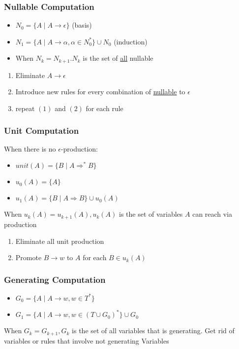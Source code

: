 \documentclass[20pt]{article} %
\begin{document}
\subsubsection{Nullable Computation}
\begin{itemize}
\item $N_0 = \{ A \mid A \rightarrow \epsilon \}$ (basis)
\item $N_1 = \{ A \mid A \rightarrow \alpha, \alpha \in N_0^{*} \} \cup N_0$ (induction)
\item When $N_k = N_{k+1}. N_k$ is the set of \underline{all} nullable
\end{itemize}
\begin{enumerate}
\item Eliminate $A \rightarrow \epsilon$
\item Introduce new rules for every combination of \underline{nullable} to \underline{$\epsilon$}
\item repeat $(1)$ and $(2)$ for each rule
\end{enumerate}
\subsubsection{Unit Computation}
When there is no $\epsilon$-production:
\begin{itemize}
\item $unit(A) = \{ B \mid A \Rightarrow^{*} B \}$
\item $u_0(A) = \{A\}$
\item $u_1(A) = \{B \mid A \Rightarrow B \} \cup u_0(A)$
\end{itemize}
When $u_k(A) = u_{k+1}(A), u_k(A)$ is the set of variables $A$ can reach via production
\begin{enumerate}
\item Eliminate all unit production
\item Promote $B \rightarrow w$ to $A$ for each $B \in u_k(A)$
\end{enumerate}
\subsubsection{Generating Computation}
\begin{itemize}
\item $G_0 = \{ A\mid A \rightarrow w, w \in T^{*}\}$
\item $G_1 = \{A \mid A \rightarrow w, w \in (T \cup G_0)^{*} \} \cup G_0$
\end{itemize}
When $G_k = G_{k+1}, G_k$ is the set of all variables that is generating.  Get rid of variables or rules that involve not generating Variables
\end{document}
